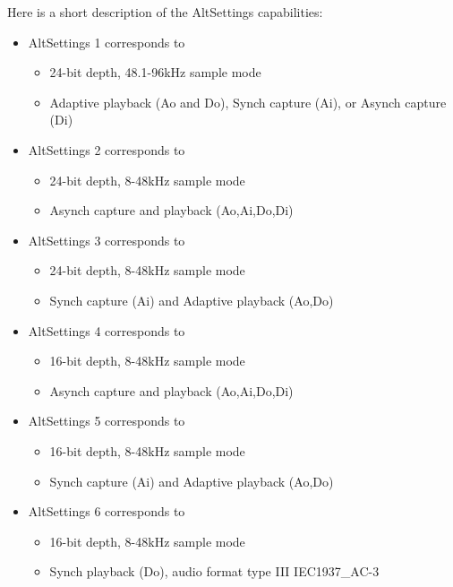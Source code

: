 \documentclass[a4paper,8pt,english]{sphinxmanual}
\begin{document}
Here is a short description of the AltSettings capabilities:
\begin{itemize}
\item {} 
AltSettings 1 corresponds to
\begin{itemize}
\item {} 
24-bit depth, 48.1-96kHz sample mode

\item {} 
Adaptive playback (Ao and Do), Synch capture (Ai), or Asynch capture (Di)

\end{itemize}

\item {} 
AltSettings 2 corresponds to
\begin{itemize}
\item {} 
24-bit depth, 8-48kHz sample mode

\item {} 
Asynch capture and playback  (Ao,Ai,Do,Di)

\end{itemize}

\item {} 
AltSettings 3 corresponds to
\begin{itemize}
\item {} 
24-bit depth, 8-48kHz sample mode

\item {} 
Synch capture (Ai) and Adaptive playback (Ao,Do)

\end{itemize}

\item {} 
AltSettings 4 corresponds to
\begin{itemize}
\item {} 
16-bit depth, 8-48kHz sample mode

\item {} 
Asynch capture and playback  (Ao,Ai,Do,Di)

\end{itemize}

\item {} 
AltSettings 5 corresponds to
\begin{itemize}
\item {} 
16-bit depth, 8-48kHz sample mode

\item {} 
Synch capture (Ai) and Adaptive playback (Ao,Do)

\end{itemize}

\item {} 
AltSettings 6 corresponds to
\begin{itemize}
\item {} 
16-bit depth, 8-48kHz sample mode

\item {} 
Synch playback (Do), audio format type III IEC1937\_AC-3

\end{itemize}

\end{itemize}
\end{document}
